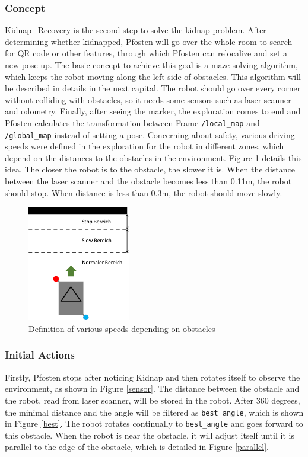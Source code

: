 \subsubsection{Concept}
Kidnap\_Recovery is the second step to solve the kidnap problem. After determining whether kidnapped, Pfosten will go over the whole room to search for QR code or other features, through which  Pfosten can relocalize and set a new pose up. The basic concept to achieve this goal is a maze-solving algorithm, which keeps the robot moving along the left side of obstacles. This algorithm will be described in details in the next capital. The robot should go over every corner without colliding with obstacles, so it needs some sensors such as laser scanner and odometry. Finally, after seeing the marker, the exploration comes to end and Pfosten calculates the transformation between Frame  \texttt{/local\_map} and \texttt{/global\_map} instead of setting a pose. Concerning about safety, various driving speeds were defined in the exploration for the robot in different zones, which depend on the distances to the obstacles in the environment. Figure \ref{Zone} details this idea. The closer the robot is to the obstacle, the slower it is. When the distance between the laser scanner and the obstacle becomes less than 0.11m, the robot should stop. When distance is less than 0.3m, the robot should move slowly.

\begin{figure}[ht]
\centering
\includegraphics[width=0.4\textwidth]{graphics/Zone.png}
\caption{Definition of various speeds depending on obstacles}
\label{Zone}
\centering
\end{figure}

\subsubsection{Initial Actions}
Firstly, Pfosten stops after noticing Kidnap and then rotates itself to observe the environment, as shown in Figure \ref{sensor}. The distance between the obstacle and the robot, read from laser scanner, will be stored in the robot. After 360 degrees, the minimal distance and the angle will be filtered as \texttt {best\_angle}, which is shown in Figure \ref{best}. The robot rotates continually to \texttt {best\_angle} and goes forward to this obstacle. When the robot is near the obstacle, it will adjust itself until it is parallel to the edge of the obstacle, which is detailed in Figure \ref{parallel}.

